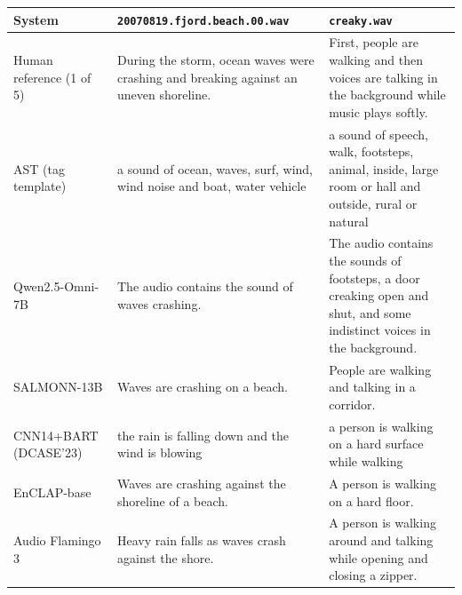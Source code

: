 \begin{tabular}{lp{6.6cm}p{6.6cm}}
\toprule
System & \texttt{20070819.fjord.beach.00.wav} & \texttt{creaky.wav} \\
\midrule
Human reference (1 of 5) & During the storm, ocean waves were crashing and breaking against an uneven shoreline. & First, people are walking and then voices are talking in the background while music plays softly. \\
\midrule
AST (tag template) & a sound of ocean, waves, surf, wind, wind noise and boat, water vehicle & a sound of speech, walk, footsteps, animal, inside, large room or hall and outside, rural or natural \\
Qwen2.5-Omni-7B & The audio contains the sound of waves crashing. & The audio contains the sounds of footsteps, a door creaking open and shut, and some indistinct voices in the background. \\
SALMONN-13B & Waves are crashing on a beach. & People are walking and talking in a corridor. \\
CNN14+BART (DCASE'23) & the rain is falling down and the wind is blowing & a person is walking on a hard surface while walking \\
EnCLAP-base & Waves are crashing against the shoreline of a beach. & A person is walking on a hard floor. \\
Audio Flamingo 3 & Heavy rain falls as waves crash against the shore. & A person is walking around and talking while opening and closing a zipper. \\
\bottomrule
\end{tabular}
